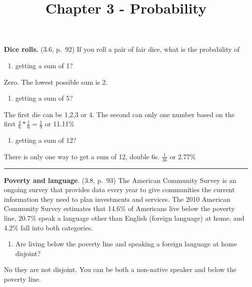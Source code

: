 \documentclass[]{article}
\title{Chapter 3 - Probability}
\author{}
\date{\vspace{-2.5em}}
\providecommand{\tightlist}{%
  \setlength{\itemsep}{0pt}\setlength{\parskip}{0pt}}
\begin{document}
\maketitle

\textbf{Dice rolls.} (3.6, p.~92) If you roll a pair of fair dice, what
is the probability of

\begin{enumerate}
\def\labelenumi{(\alph{enumi})}
\tightlist
\item
  getting a sum of 1?
\end{enumerate}

Zero. The lowest possible sum is 2.

\begin{enumerate}
\def\labelenumi{(\alph{enumi})}
\setcounter{enumi}{1}
\tightlist
\item
  getting a sum of 5?
\end{enumerate}

The first die can be 1,2,3 or 4. The second can only one number based on
the first \(\frac{4}{6}*\frac{1}{6}=\frac{1}{9}\) or 11.11\%

\begin{enumerate}
\def\labelenumi{(\alph{enumi})}
\setcounter{enumi}{2}
\tightlist
\item
  getting a sum of 12?
\end{enumerate}

There is only one way to get a sum of 12, double 6s. \(\frac{1}{36}\) or
2.77\%

\begin{center}\rule{0.5\linewidth}{0.5pt}\end{center}

\clearpage

\textbf{Poverty and language}. (3.8, p.~93) The American Community
Survey is an ongoing survey that provides data every year to give
communities the current information they need to plan investments and
services. The 2010 American Community Survey estimates that 14.6\% of
Americans live below the poverty line, 20.7\% speak a language other
than English (foreign language) at home, and 4.2\% fall into both
categories.

\begin{enumerate}
\def\labelenumi{(\alph{enumi})}
\tightlist
\item
  Are living below the poverty line and speaking a foreign language at
  home disjoint?
\end{enumerate}

No they are not disjoint. You can be both a non-native speaker and below
the poverty line.
\end{document}
